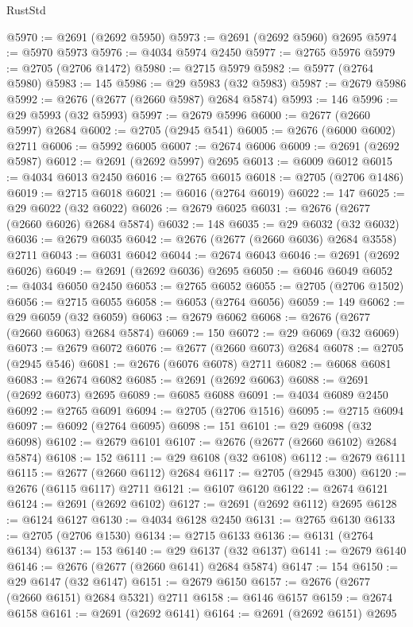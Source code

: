 \begin{lexlean}{RustStd}
\begin{coremodule}
{\begin{coremodule}
{{{{{{{{{{{{{{{{{{{{{{{{{{{{{{{{{{{{{{{{{{{{{{{{{{{{{{{@5970 := @2691 (@2692 @5950)
@5973 := @2691 (@2692 @5960) @2695
@5974 := @5970 @5973
@5976 := @4034 @5974 @2450
@5977 := @2765 @5976
@5979 := @2705 (@2706 @1472)
@5980 := @2715 @5979
@5982 := @5977 (@2764 @5980)
@5983 := 145
@5986 := @29 @5983 (@32 @5983)
@5987 := @2679 @5986
@5992 := @2676 (@2677 (@2660 @5987) @2684 @5874)
@5993 := 146
@5996 := @29 @5993 (@32 @5993)
@5997 := @2679 @5996
@6000 := @2677 (@2660 @5997) @2684
@6002 := @2705 (@2945 @541)
@6005 := @2676 (@6000 @6002) @2711
@6006 := @5992 @6005
@6007 := @2674 @6006
@6009 := @2691 (@2692 @5987)
@6012 := @2691 (@2692 @5997) @2695
@6013 := @6009 @6012
@6015 := @4034 @6013 @2450
@6016 := @2765 @6015
@6018 := @2705 (@2706 @1486)
@6019 := @2715 @6018
@6021 := @6016 (@2764 @6019)
@6022 := 147
@6025 := @29 @6022 (@32 @6022)
@6026 := @2679 @6025
@6031 := @2676 (@2677 (@2660 @6026) @2684 @5874)
@6032 := 148
@6035 := @29 @6032 (@32 @6032)
@6036 := @2679 @6035
@6042 := @2676 (@2677 (@2660 @6036) @2684 @3558) @2711
@6043 := @6031 @6042
@6044 := @2674 @6043
@6046 := @2691 (@2692 @6026)
@6049 := @2691 (@2692 @6036) @2695
@6050 := @6046 @6049
@6052 := @4034 @6050 @2450
@6053 := @2765 @6052
@6055 := @2705 (@2706 @1502)
@6056 := @2715 @6055
@6058 := @6053 (@2764 @6056)
@6059 := 149
@6062 := @29 @6059 (@32 @6059)
@6063 := @2679 @6062
@6068 := @2676 (@2677 (@2660 @6063) @2684 @5874)
@6069 := 150
@6072 := @29 @6069 (@32 @6069)
@6073 := @2679 @6072
@6076 := @2677 (@2660 @6073) @2684
@6078 := @2705 (@2945 @546)
@6081 := @2676 (@6076 @6078) @2711
@6082 := @6068 @6081
@6083 := @2674 @6082
@6085 := @2691 (@2692 @6063)
@6088 := @2691 (@2692 @6073) @2695
@6089 := @6085 @6088
@6091 := @4034 @6089 @2450
@6092 := @2765 @6091
@6094 := @2705 (@2706 @1516)
@6095 := @2715 @6094
@6097 := @6092 (@2764 @6095)
@6098 := 151
@6101 := @29 @6098 (@32 @6098)
@6102 := @2679 @6101
@6107 := @2676 (@2677 (@2660 @6102) @2684 @5874)
@6108 := 152
@6111 := @29 @6108 (@32 @6108)
@6112 := @2679 @6111
@6115 := @2677 (@2660 @6112) @2684
@6117 := @2705 (@2945 @300)
@6120 := @2676 (@6115 @6117) @2711
@6121 := @6107 @6120
@6122 := @2674 @6121
@6124 := @2691 (@2692 @6102)
@6127 := @2691 (@2692 @6112) @2695
@6128 := @6124 @6127
@6130 := @4034 @6128 @2450
@6131 := @2765 @6130
@6133 := @2705 (@2706 @1530)
@6134 := @2715 @6133
@6136 := @6131 (@2764 @6134)
@6137 := 153
@6140 := @29 @6137 (@32 @6137)
@6141 := @2679 @6140
@6146 := @2676 (@2677 (@2660 @6141) @2684 @5874)
@6147 := 154
@6150 := @29 @6147 (@32 @6147)
@6151 := @2679 @6150
@6157 := @2676 (@2677 (@2660 @6151) @2684 @5321) @2711
@6158 := @6146 @6157
@6159 := @2674 @6158
@6161 := @2691 (@2692 @6141)
@6164 := @2691 (@2692 @6151) @2695
}}}}}}}}}}}}}}}}}}}}}}}}}}}}}}}}}}}}}}}}}}}}}}}}}}}}}}}
\end{coremodule}}
\end{coremodule}
\end{lexlean}
